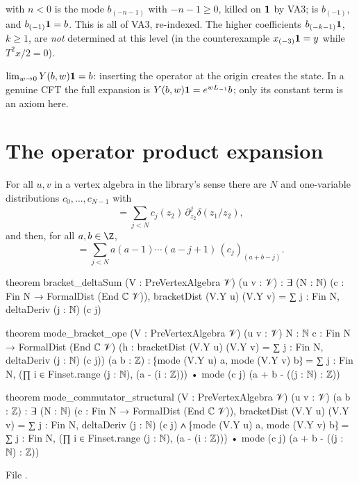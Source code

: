 \begin{dictionary}
 with $n<0$ is the mode $b_{(-n-1)}$ with $-n-1\ge0$, killed on $\mathbf{1}$ by VA3;
 is $b_{(-1)}$, and $b_{(-1)}\mathbf{1} = b$. This is all of VA3, re-indexed. The
higher coefficients $b_{(-k-1)}\mathbf{1}$, $k\ge1$, are \emph{not} determined at this level (in the
counterexample $x_{(-3)}\mathbf{1} = y$ while $T^2x/2 = 0$).
\end{dictionary}

\begin{physics}
$\lim_{w\to0}Y(b,w)\mathbf{1} = b$: inserting the operator at the origin creates the state. In a
genuine CFT the full expansion is $Y(b,w)\mathbf{1} = e^{wL_{-1}}b$; only its constant term is an
axiom here.
\end{physics}

\section{The operator product expansion}\label{l03:sec:ope}

\begin{theorem}\label{l03:thm:ope}
For all $u,v$ in a vertex algebra in the library's sense there are $N$ and one-variable
distributions $c_0,\dots,c_{N-1}$ with
\begin{equation*}
[Y(u,z_1),Y(v,z_2)] = \sum_{j<N}c_j(z_2)\,\partial_{z_2}^j\delta(z_1/z_2),
\end{equation*}
and then, for all $a,b\in\Z$,
\begin{equation*}
[u_{(a)},v_{(b)}] = \sum_{j<N}a(a-1)\cdots(a-j+1)\,(c_j)_{(a+b-j)} .
\end{equation*}
\end{theorem}
\begin{leancode}
theorem bracket_deltaSum (V : PreVertexAlgebra 𝒱) (u v : 𝒱) :
    ∃ (N : ℕ) (c : Fin N → FormalDist (End ℂ 𝒱)),
      bracketDist (V.Y u) (V.Y v) = ∑ j : Fin N, deltaDeriv (j : ℕ) (c j)

theorem mode_bracket_ope (V : PreVertexAlgebra 𝒱) (u v : 𝒱) {N : ℕ}
    {c : Fin N → FormalDist (End ℂ 𝒱)}
    (h : bracketDist (V.Y u) (V.Y v) = ∑ j : Fin N, deltaDeriv (j : ℕ) (c j)) (a b : ℤ) :
    ⁅mode (V.Y u) a, mode (V.Y v) b⁆ = ∑ j : Fin N,
      (∏ i ∈ Finset.range (j : ℕ), (a - (i : ℤ))) • mode (c j) (a + b - ((j : ℕ) : ℤ))

theorem mode_commutator_structural (V : PreVertexAlgebra 𝒱) (u v : 𝒱) (a b : ℤ) :
    ∃ (N : ℕ) (c : Fin N → FormalDist (End ℂ 𝒱)),
      bracketDist (V.Y u) (V.Y v) = ∑ j : Fin N, deltaDeriv (j : ℕ) (c j) ∧
      ⁅mode (V.Y u) a, mode (V.Y v) b⁆ = ∑ j : Fin N,
        (∏ i ∈ Finset.range (j : ℕ), (a - (i : ℤ))) • mode (c j) (a + b - ((j : ℕ) : ℤ))
\end{leancode}
File .

